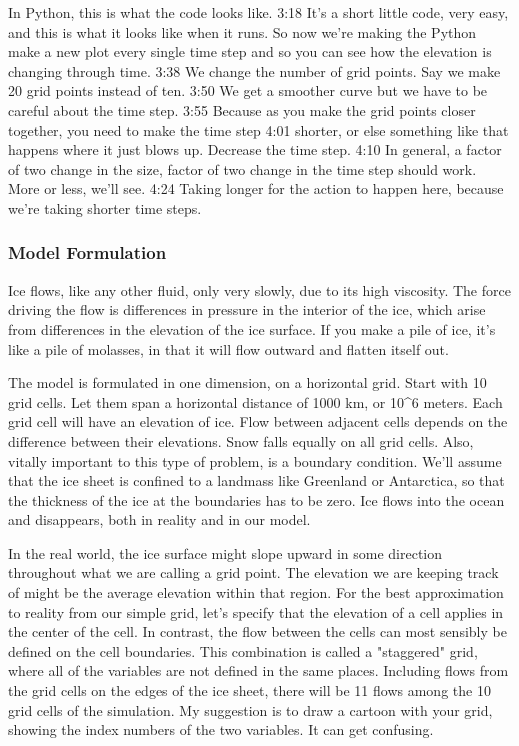 In Python, this is what the code looks like. 
3:18
It's a short little code, very easy, and this is what it looks like when it runs. So now we're making the Python make a new plot every single time step and so you can see how the elevation is changing through time. 
3:38
We change the number of grid points. Say we make 20 grid points instead of ten. 
3:50
We get a smoother curve but we have to be careful about the time step. 
3:55
Because as you make the grid points closer together, you need to make the time step 
4:01
shorter, or else something like that happens where it just blows up. Decrease the time step. 
4:10
In general, a factor of two change in the size, factor of two change in the time step should work. More or less, we'll see. 
4:24
Taking longer for the action to happen here, because we're taking shorter time steps. 

\subsubsection{Model Formulation}\index{}
Ice flows, like any other fluid, only very slowly, due to its high viscosity. The force driving the flow is differences in pressure in the interior of the ice, which arise from differences in the elevation of the ice surface. If you make a pile of ice, it's like a pile of molasses, in that it will flow outward and flatten itself out.

The model is formulated in one dimension, on a horizontal grid. Start with 10 grid cells. Let them span a horizontal distance of 1000 km, or 10^6 meters. Each grid cell will have an elevation of ice. Flow between adjacent cells depends on the difference between their elevations. Snow falls equally on all grid cells. Also, vitally important to this type of problem, is a boundary condition. We'll assume that the ice sheet is confined to a landmass like Greenland or Antarctica, so that the thickness of the ice at the boundaries has to be zero. Ice flows into the ocean and disappears, both in reality and in our model.

In the real world, the ice surface might slope upward in some direction throughout what we are calling a grid point. The elevation we are keeping track of might be the average elevation within that region. For the best approximation to reality from our simple grid, let's specify that the elevation of a cell applies in the center of the cell. In contrast, the flow between the cells can most sensibly be defined on the cell boundaries. This combination is called a "staggered" grid, where all of the variables are not defined in the same places. Including flows from the grid cells on the edges of the ice sheet, there will be 11 flows among the 10 grid cells of the simulation. My suggestion is to draw a cartoon with your grid, showing the index numbers of the two variables. It can get confusing.

